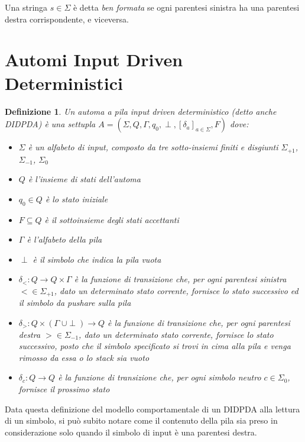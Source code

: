 \documentclass[a4paper,12pt]{report}
\newtheorem{definition}{Definizione}[chapter]
\theoremstyle{propositionstyle}
\begin{document}
    Una stringa $s \in \Sigma$ è detta \textit{ben formata} se ogni parentesi sinistra ha una parentesi destra corrispondente, e viceversa.

    \section{Automi Input Driven Deterministici}

    \begin{definition}
        Un \textit{automa a pila input driven deterministico} (detto anche DIDPDA) è una settupla $A = (\Sigma, Q, \Gamma, q_0, \perp, \left[ \delta_a \right]_{a \in \Sigma}, F)$ dove:
        \begin{itemize}
            \item $\Sigma$ è un alfabeto di input, composto da tre sotto-insiemi finiti e disgiunti $\Sigma_{+1}$, $\Sigma_{-1}$, $\Sigma_{0}$
            \item $Q$ è l'insieme di stati dell'automa
            \item $q_{0} \in Q$ è lo stato iniziale
            \item $F \subseteq Q$ è il sottoinsieme degli stati \textit{accettanti}
            \item $\Gamma$ è  l'\textit{alfabeto della pila}
            \item $\perp$ è il simbolo che indica la pila vuota
            \item $\delta_{<} : Q \rightarrow Q \times \Gamma$ è la funzione di transizione che, per ogni parentesi sinistra $< \in \Sigma_{+1}$, dato un determinato stato corrente, fornisce lo stato successivo ed il simbolo da pushare sulla pila
            \item $\delta_{>} : Q \times (\Gamma\;\cup\perp) \rightarrow Q$ è la funzione di transizione che, per ogni parentesi destra $> \in \Sigma_{-1}$, dato un determinato stato corrente, fornisce lo stato successivo, posto che il simbolo specificato si trovi in cima alla pila e venga rimosso da essa o lo stack sia vuoto
            \item $\delta_{c} : Q \rightarrow Q$ è la funzione di transizione che, per ogni simbolo neutro $c \in \Sigma_{0}$, fornisce il prossimo stato
        \end{itemize}
    \end{definition}

    Data questa definizione del modello comportamentale di un DIDPDA alla lettura di un simbolo, si può subito notare come il contenuto della pila
    sia preso in considerazione solo quando il simbolo di input è una parentesi destra. 
    
\end{document}
